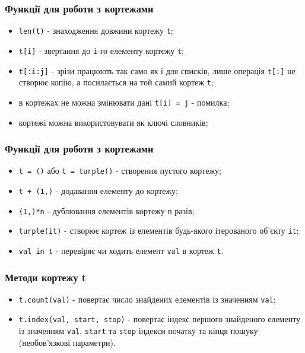 \begin{frame}
\frametitle{Функції для роботи з кортежами}
\begin{itemize}
  \item \texttt{len(t)} - знаходження довжини  кортежу \texttt{t};
  \item \texttt{t[i]} - звертання до \texttt{i}-го елементу  кортежу \texttt{t};
  \item \texttt{t[:i:j]} - зрізи працюють так само як і для списків, лише операція \texttt{t[:]} не створює копію, а посилається на той самий кортеж \texttt{t};
  \item в кортежах не можна змінювати дані \texttt{t[i] = j} - помилка;
  \item кортежі можна використовувати як ключі словників;
\end{itemize}

\end{frame}

\begin{frame}
\frametitle{Функції для роботи з кортежами}
\begin{itemize}
  \item \texttt{t = ()} або \texttt{t = turple()} - створення пустого кортежу;
  \item \texttt{t + (1,)} - додавання елементу до кортежу;
  \item \texttt{(1,)*n} - дублювання елементів кортежу \texttt{n} разів;
  \item \texttt{turple(it)} - створює кортеж із елементів будь-якого ітерованого об'єкту \texttt{it};
  \item \texttt{val in t} - перевіряє чи ходить елемент \texttt{val} в кортеж \texttt{t}.
\end{itemize}

\end{frame}

\begin{frame}
\frametitle{Методи кортежу t}
    \begin{itemize}
        \item<1-> \texttt{t.count(val)} - повертає число знайдених елементів із значенням \texttt{val};
        \item<2-> \texttt{t.index(val, start, stop)} - повертає індекс першого знайденого елементу із значенням \texttt{val}, \texttt{start} та \texttt{stop} індекси початку та кінця пошуку (необов'язкові параметри).
    \end{itemize}
\end{frame}

